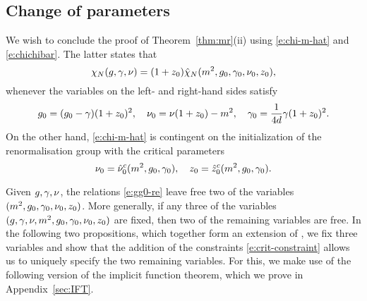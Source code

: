 
\subsection{Change of parameters}
\label{sec:nuztilde}

We wish to conclude the proof of Theorem~\ref{thm:mr}(ii) using \eqref{e:chi-m-hat}
and \eqref{e:chichibar}. The latter states that
\begin{equation}
\label{e:chichihat}
\chi_N(g, \gamma, \nu)
	=
(1 + z_0) \hat\chi_N(m^2, g_0, \gamma_0, \nu_0, z_0),
\end{equation}
whenever the variables on the left- and right-hand sides satisfy
\begin{equation}
\label{e:gg0-re}
g_0 = (g_0 - \gamma) (1 + z_0)^2,
\quad
\nu_0 = \nu (1 + z_0) - m^2,
\quad
\gamma_0 = \frac{1}{4d} \gamma (1 + z_0)^2.
\end{equation}
On the other hand, \eqref{e:chi-m-hat} is contingent on the initialization of
the renormalisation group with the critical parameters
\begin{equation}
\label{e:crit-constraint}
\nu_0 = \hat \nu_0^c(m^2, g_0, \gamma_0),
	\quad
z_0   = \hat z_0^c(m^2, g_0, \gamma_0).
\end{equation}

Given $g,\gamma,\nu$,
the relations \eqref{e:gg0-re} leave free two of the variables
$(m^2, g_0, \gamma_0, \nu_0, z_0)$.
More generally, if any three of the variables
$(g, \gamma, \nu, m^2, g_0, \gamma_0, \nu_0, z_0)$
are fixed, then two of the remaining variables are free.
In the following two propositions, which together form an extension of
\cite[Proposition~\ref{log-prop:changevariables}]{BBS-saw4-log},
we fix three variables and show that the addition of the constraints
\eqref{e:crit-constraint}
allows us to uniquely specify the two remaining variables.
For this, we make use of the following version of the
implicit function theorem, which we prove in Appendix~\ref{sec:IFT}.

